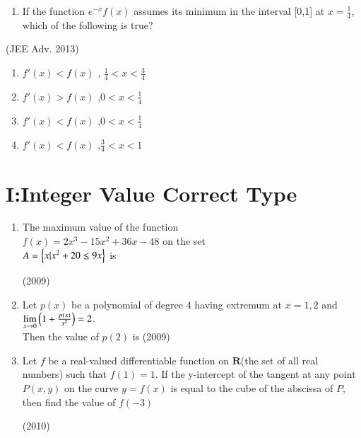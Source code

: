 \documentclass[journal,,12pt,twocolumn]{IEEEtran}
\theoremstyle{remark}
\begin{document}
\begin{enumerate}
\begin{enumerate}
\end{enumerate}


\item If the function $e^{-x}f(x)$ assumes its minimum in the interval [0,1] at $x=\frac{1}{4}$, which of the following is true?
\end{enumerate}

\hfill{(JEE Adv. 2013)}

\begin{enumerate}

\item $f'(x)<f(x)$ , $\frac{1}{4}<x<\frac{3}{4}$ \\

\item $f'(x)>f(x)$ ,$0<x<\frac{1}{4}$ \\ 

\item $f'(x)<f(x)$ ,$0<x<\frac{1}{4}$ \\

\item $f'(x)<f(x)$ ,$\frac{3}{4}<x<1$ \\


\end{enumerate}


\section*{I:Integer Value Correct Type}

\begin{enumerate}
\item The maximum value of the function \\
$f(x)=2x^3-15x^2+36x-48$ on the set\\
$A=\left\{x|x^2+20 \le 9x\right\}$ is

\hfill {(2009)}

\item Let $p(x)$ be a polynomial of degree 4 having extremum at $x=1,2 $ and $\lim \limits_{x\to 0} \left(1+\frac{p(x)}{x^2}\right) = 2$.\\
Then the value of $p(2)$ is
\hfill{(2009)}
\item Let $f$ be a real-valued differentiable function on $\textbf{R}$(the set of all real numbers) such that $f(1)=1$. If the y-intercept of the tangent at any point $P(x,y)$ on the curve $y=f(x)$ is equal to the cube of the abscissa of $P$, then find the value of $f(-3)$

    \hfill {(2010)}


\end{enumerate}
\end{document}

